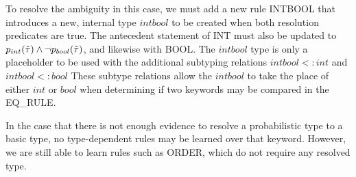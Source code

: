 To resolve the ambiguity in this case, we must add a new rule {\scriptsize INTBOOL} that introduces a new, internal type $intbool$ to be created when both resolution predicates are true.
The antecedent statement of {\scriptsize INT} must also be updated to $p_{int}(\tilde{\tau}) \land \neg p_{bool}(\tilde{\tau})$, and likewise with {\scriptsize BOOL}.
The $intbool$ type is only a placeholder to be used with the additional subtyping relations $intbool <: int$ and $intbool <: bool$
These subtype relations allow the $intbool$ to take the place of either $int$ or $bool$ when determining if two keywords may be compared in the {\scriptsize EQ\_RULE}.


In the case that there is not enough evidence to resolve a probabilistic type to a basic type, no type-dependent rules may be learned over that keyword.
However, we are still able to learn rules such as {\scriptsize ORDER}, which do not require any resolved type. 



